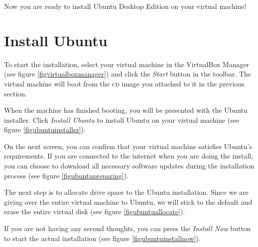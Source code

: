 \documentclass[final,ebook,10pt,twoside,openright]{memoir}
\begin{document}

Now you are ready to install Ubuntu Desktop Edition on your virtual machine!


\section{Install Ubuntu}
\label{sec:Install Ubuntu}

To start the installation, select your virtual machine in the VirtualBox Manager (see figure \ref{figvirtualboxmanager}) and click the \emph{Start} button in the toolbar. The virtual machine will boot from the \textsc{cd} image you attached to it in the previous section.


When the machine has finished booting, you will be presented with the Ubuntu installer. Click \emph{Install Ubuntu} to install Ubuntu on your virtual machine (see figure \ref{figubuntuinstaller}).


On the next screen, you can confirm that your virtual machine satisfies Ubuntu's requirements. If you are connected to the internet when you are doing the install, you can choose to download all necessary software updates during the installation process (see figure \ref{figubuntupreparing}).


The next step is to allocate drive space to the Ubuntu installation. Since we are giving over the entire virtual machine to Ubuntu, we will stick to the default and erase the entire virtual disk (see figure \ref{figubuntuallocate}).


If you are not having any second thoughts, you can press the \emph{Install Now} button to start the actual installation (see figure \ref{figubuntuinstallnow}).

\end{document}
